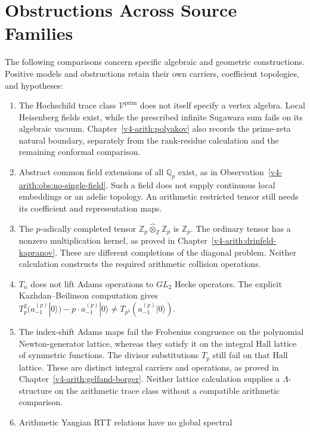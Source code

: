 \section{Obstructions Across Source Families}
\label{v4-arith:app:B:falsifications}

The following comparisons concern specific algebraic and geometric
constructions. Positive models and obstructions retain their own
carriers, coefficient topologies, and hypotheses:

\begin{enumerate}
\item The Hochschild trace class \(\mathcal V^{\mathrm{prim}}\)
does not itself specify a vertex algebra. Local Heisenberg fields
exist, while the prescribed infinite Sugawara sum fails on its
algebraic vacuum. Chapter~\ref{v4-arith:polyakov} also records the
prime-zeta natural boundary, separately from the rank-residue
calculation and the remaining conformal comparison.
\item Abstract common field extensions of all \(\mathbb Q_p\)
exist, as in Observation~\ref{v4-arith:obs:no-single-field}.
Such a field does not supply continuous local embeddings or an
adelic topology. An arithmetic restricted tensor still needs its
coefficient and representation maps.
\item The \(p\)-adically completed tensor
\(\mathbb Z_p\widehat\otimes_{\mathbb Z}\mathbb Z_p\)
is \(\mathbb Z_p\). The ordinary tensor has a nonzero multiplication
kernel, as proved in Chapter~\ref{v4-arith:drinfeld-kapranov}.
These are different completions of the diagonal problem.
Neither calculation constructs the required arithmetic collision
operations.
\item \(T_{n}\) does not lift Adams operations to \(GL_{2}\) Hecke
operators. The explicit Kazhdan--Beilinson computation gives
\(T_{p}^{2}(a^{(p)}_{-1}|0\rangle)-p\cdot a^{(p)}_{-1}|0\rangle\neq T_{p^{2}}(a^{(p)}_{-1}|0\rangle)\).
\item The index-shift Adams maps fail the Frobenius congruence on
 the polynomial Newton-generator lattice, whereas they satisfy it on
 the integral Hall lattice of symmetric functions. The divisor
 substitutions \(T_p\) still fail on that Hall lattice.
 These are distinct integral carriers and operations, as proved in
 Chapter~\ref{v4-arith:gelfand-borger}. Neither lattice calculation
 supplies a \(\Lambda\)-structure on the arithmetic trace class
 without a compatible arithmetic comparison.
\item Arithmetic Yangian RTT relations have no global spectral

\end{enumerate}
